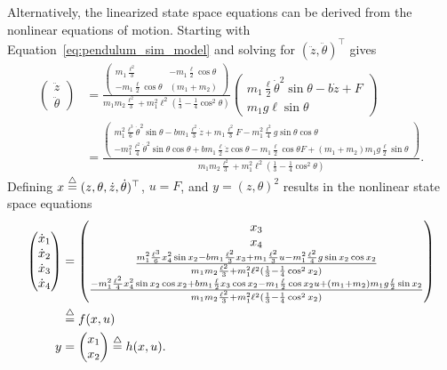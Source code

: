Alternatively, the linearized state space equations can be derived from the nonlinear equations of motion.  Starting with Equation~\eqref{eq:pendulum_sim_model} and solving for $(\ddot{z}, \ddot{\theta})^\top$ gives
{\small
\begin{align*}
\begin{pmatrix} \ddot{z} \\ \ddot{\theta} \end{pmatrix}
  &= \frac{\begin{pmatrix} m_1\frac{\ell^2}{3} & -m_1\frac{\ell}{2}\cos\theta \\ -m_1\frac{\ell}{2}\cos\theta & (m_1+m_2)\end{pmatrix}}{m_1m_2\frac{\ell^2}{3} + m_1^2 \ell^2(\frac{1}{3} -\frac{1}{4}\cos^2\theta)}\begin{pmatrix} m_1\frac{\ell}{2}\dot{\theta}^2\sin\theta-b\dot{z}+F \\ m_1g\ell\sin\theta \end{pmatrix} \\
  &= \frac{\begin{pmatrix} m_1^2\frac{\ell^3}{6}\dot{\theta}^2\sin\theta - bm_1\frac{\ell^2}{3}\dot{z} + m_1\frac{\ell^2}{3}F - m_1^2\frac{\ell^2}{4}g\sin\theta\cos\theta \\ 
  -m_1^2\frac{\ell^2}{4}\dot{\theta}^2\sin\theta\cos\theta + bm_1\frac{\ell}{2}\dot{z}\cos\theta - m_1\frac{\ell}{2}\cos\theta F + (m_1+m_2)m_1g\frac{\ell}{2}\sin\theta\end{pmatrix}}{m_1m_2\frac{\ell^2}{3} + m_1^2 \ell^2(\frac{1}{3} -\frac{1}{4}\cos^2\theta)}.
\end{align*}
}
Defining $x\stackrel{\triangle}{=} (z, \theta, \dot{z}, \dot{\theta})^\top$, $u=F$, and $y=(z, \theta)^2$ results in the nonlinear state space equations
{\normalsize
\begin{align*}
\begin{pmatrix}\dot{x}_1 \\ \dot{x}_2 \\ \dot{x}_3 \\ \dot{x}_4 \end{pmatrix} &= \begin{pmatrix} x_3 \\ x_4 \\ 
\frac{ m_1^2\frac{\ell^3}{6}x_4^2\sin x_2 - bm_1\frac{\ell^2}{3}x_3 + m_1\frac{\ell^2}{3}u - m_1^2\frac{\ell^2}{4}g\sin x_2 \cos x_2}{m_1m_2\frac{\ell^2}{3} + m_1^2 \ell^2(\frac{1}{3} -\frac{1}{4}\cos^2 x_2)} \\
\frac{-m_1^2\frac{\ell^2}{4}x_4^2\sin x_2 \cos x_2 + bm_1\frac{\ell}{2} x_3 \cos x_2 - m_1\frac{\ell}{2}\cos x_2 u + (m_1+m_2)m_1g\frac{\ell}{2}\sin x_2}{m_1m_2\frac{\ell^2}{3} + m_1^2 \ell^2(\frac{1}{3} -\frac{1}{4}\cos^2x_2)}
\end{pmatrix} \\ 
&\stackrel{\triangle}{=} f(x,u) \\
y &= \begin{pmatrix} x_1 \\ x_2 \end{pmatrix} \stackrel{\triangle}{=} h(x,u).
\end{align*}
}
